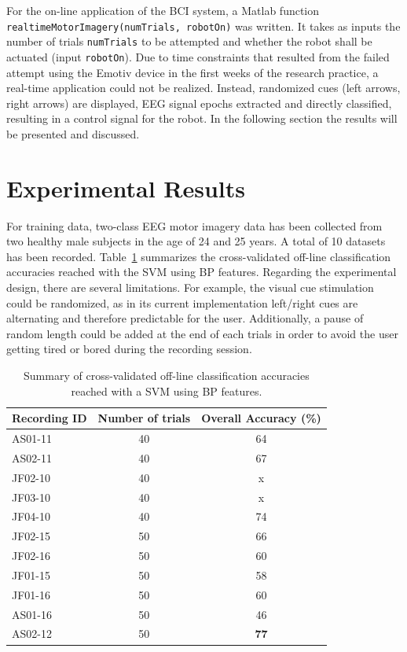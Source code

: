 \documentclass[a4paper,oneside, openright,12pt]{report}
\begin{document}
For the on-line application of the BCI system, a Matlab function\\ \texttt{realtimeMotorImagery(numTrials, robotOn)} was written. It takes as inputs the number of trials \texttt{numTrials} to be attempted and whether the robot shall be actuated (input \texttt{robotOn}). Due to time constraints that resulted from the failed attempt using the Emotiv device in the first weeks of the research practice, a real-time application could not be realized. Instead, randomized cues (left arrows, right arrows) are displayed, EEG signal epochs extracted and directly classified, resulting in a control signal for the robot. In the following section the results will be presented and discussed.


\section{Experimental Results}
For training data, two-class EEG motor imagery data has been collected from two healthy male subjects in the age of 24 and 25 years. A total of 10 datasets has been recorded. Table~\ref{tab:class-results} summarizes the cross-validated off-line classification accuracies reached with the SVM using BP features. Regarding the experimental design, there are several limitations. For example, the visual cue stimulation could be randomized, as in its current implementation left/right cues are alternating and therefore predictable for the user. Additionally, a pause of random length could be added at the end of each trials in order to avoid the user getting tired or bored during the recording session.

\begin{table}[h!!!]
	\centering
	\begin{tabular}{lcc}
		\textbf{Recording ID}	&\textbf{Number of trials}  &\textbf{Overall Accuracy (\%)} \\ 
		\hline 
		\hline  AS01-11&  40& 64\\ 
		\hline	AS02-11&  40& 67\\ 
		\hline	JF02-10&  40& x\\ 
		\hline	JF03-10&  40& x\\
		\hline	JF04-10&  40& 74\\
		\hline  JF02-15&  50& 66\\
		\hline  JF02-16&  50&  60\\
		\hline  JF01-15&  50& 58\\
		\hline  JF01-16&  50& 60\\
		\hline  AS01-16&  50& 46\\
		\hline  AS02-12&  50& \textbf{77}\\
		
	\end{tabular} 
	\caption{Summary of cross-validated off-line classification accuracies reached with a SVM using BP features.}
	\label{tab:class-results}
\end{table}
\end{document}
